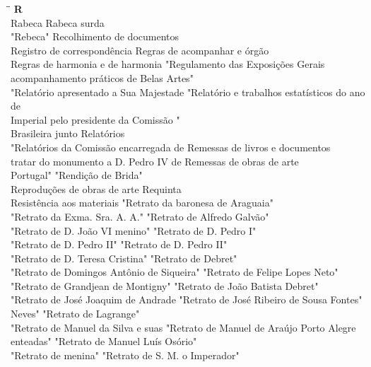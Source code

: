 \begin{tabbing}
	\hspace{8,7cm}\=\hspace{1cm}\=\kill
	\textbf{R} \>  \\ 
	Rabeca \> Rabeca surda\\
	"Rebeca" \> Recolhimento de documentos\\
	Registro de correspondência\> Regras de acompanhar e órgão\\
	Regras de harmonia e de harmonia  \> "Regulamento das Exposições Gerais\\ 
	acompanhamento práticos \>  de Belas Artes"\\ 
	"Relatório apresentado a Sua Majestade \> "Relatório e trabalhos estatísticos do ano de\\ 
	Imperial pelo presidente da Comissão  "\\
	Brasileira junto \> Relatórios\\
	"Relatórios da Comissão encarregada de \> Remessas de livros e documentos\\
	tratar do monumento a D. Pedro IV de \> Remessas de obras de arte\\
	Portugal" \> "Rendição de Brida"\\
	Reproduções de obras de arte \> Requinta\\
	Resistência aos materiais \> "Retrato da baronesa de Araguaia"\\
	"Retrato da Exma. Sra. A. A." \> "Retrato de Alfredo Galvão"\\
	"Retrato de D. João VI menino" \> "Retrato de D. Pedro I"\\
	"Retrato de D. Pedro II" \> "Retrato de D. Pedro II"\\
	"Retrato de D. Teresa Cristina" \> "Retrato de Debret"\\
	"Retrato de Domingos Antônio de Siqueira" \> "Retrato de Felipe Lopes Neto"\\
	"Retrato de Grandjean de Montigny"\> "Retrato de João Batista Debret"\\
	"Retrato de José Joaquim de Andrade \> "Retrato de José Ribeiro de Sousa Fontes"\\ 
	Neves"\> "Retrato de Lagrange"\\ 
	"Retrato de Manuel da Silva e suas \> "Retrato de Manuel de Araújo Porto Alegre\\
	enteadas" \> "Retrato de Manuel Luís Osório"\\
	"Retrato de menina" \> "Retrato de S. M. o Imperador"\\

\end{tabbing}
